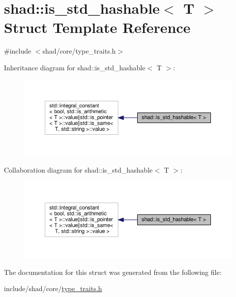 \hypertarget{structshad_1_1is__std__hashable}{\section{shad\-:\-:is\-\_\-std\-\_\-hashable$<$ T $>$ Struct Template Reference}
\label{structshad_1_1is__std__hashable}
}


{\ttfamily \#include $<$shad/core/type\-\_\-traits.\-h$>$}



Inheritance diagram for shad\-:\-:is\-\_\-std\-\_\-hashable$<$ T $>$\-:
\nopagebreak
\begin{figure}[H]
\begin{center}
\leavevmode
\includegraphics[width=350pt]{structshad_1_1is__std__hashable__inherit__graph}
\end{center}
\end{figure}


Collaboration diagram for shad\-:\-:is\-\_\-std\-\_\-hashable$<$ T $>$\-:
\nopagebreak
\begin{figure}[H]
\begin{center}
\leavevmode
\includegraphics[width=350pt]{structshad_1_1is__std__hashable__coll__graph}
\end{center}
\end{figure}


The documentation for this struct was generated from the following file\-:\begin{DoxyCompactItemize}
\item 
include/shad/core/\hyperlink{type__traits_8h}{type\-\_\-traits.\-h}\end{DoxyCompactItemize}

